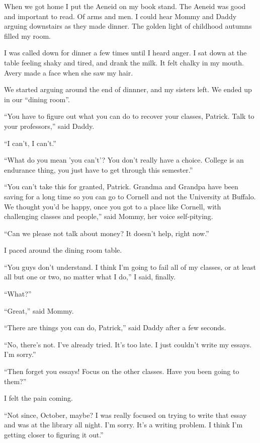 When we got home I put the Aeneid on my book stand.  The Aeneid was good and
important to read.  Of arms and men.  I could hear Mommy and Daddy arguing
downstairs as they made dinner.   The golden light of childhood autumns filled
my room.

I was called down for dinner a few times until I heard anger.  I sat down at the
table feeling shaky and tired, and drank the milk.  It felt chalky in my mouth.
Avery made a face when she saw my hair.

We started arguing around the end of dinnner, and my sisters left.  We ended up
in our ``dining room''.

``You have to figure out what you can do to recover your classes, Patrick.  Talk
to your professors,'' said Daddy.

``I can't, I can't.'' 

``What do you mean 'you can't'?  You don't really have a choice.  College is an
endurance thing, you just have to get through this semester.''

``You can't take this for granted, Patrick.  Grandma and Grandpa have been saving
for a long time so you can go to Cornell and not the University at Buffalo.  We
thought you'd be happy, once you got to a place like Cornell, with challenging
classes and people,'' said Mommy, her voice self-pitying.

``Can we please not talk about money?  It doesn't help, right now.''

I paced around the dining room table.

``You guys don't understand.  I think I'm going to fail all of my classes, or at
least all but one or two, no matter what I do,'' I said, finally.

``What?''

``Great,'' said Mommy.

``There are things you can do, Patrick,'' said Daddy after a few seconds.

``No, there's not.  I've already tried.  It's too late.  I just couldn't write my essays.  I'm
sorry.''

``Then forget you essays!  Focus on the other classes.  Have you been going to
them?''

I felt the pain coming.

``Not since, October, maybe?  I was really focused on trying to write that essay
and was at the library all night.  I'm sorry.  It's a writing problem.  I think
I'm getting closer to figuring it out.''
 
